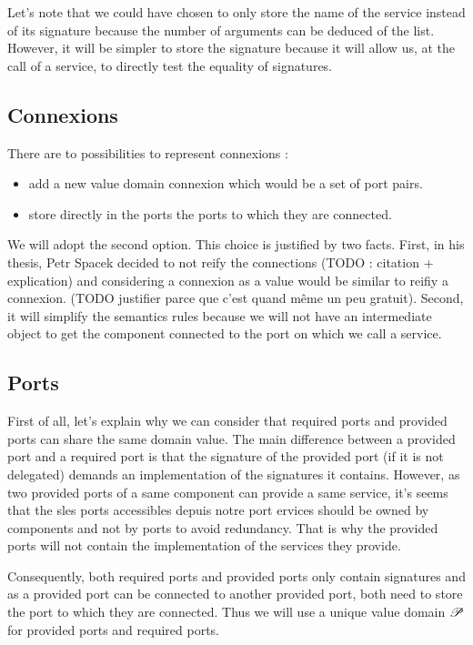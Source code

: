 Let's note that we could have chosen to only store the name of the service instead of its signature because the number of arguments can be deduced of the list. However, it will be simpler to store the signature because it will allow us, at the call of a service, to directly test the equality of signatures.


\subsection{Connexions} There are to possibilities to represent connexions :
\begin{itemize}
\item add a new value domain \textsf{connexion} which would be a set of port pairs. 
\item store directly in the ports the ports to which they are connected.
\end{itemize}

We will adopt the second option. This choice is justified by two facts. First, in his thesis, Petr Spacek decided to not reify the connections (TODO : citation + explication) and considering a connexion as a value would be similar to reifiy a connexion. (TODO justifier parce que c'est quand même un peu gratuit).  Second, it will simplify the semantics rules because we will not have an intermediate object to get the component connected to the port on which we call a service.

\subsection{Ports}
\label{value_ports}
First of all, let's explain why we can consider that required ports and provided ports can share the same domain value. The main difference between a provided port and a required port is that the signature of the provided port (if it is not delegated) demands an implementation of the signatures it contains. However, as two provided ports of a same component can provide a same service, it's seems that the sles ports accessibles depuis notre port ervices should be owned by components and not by ports to avoid redundancy. That is why the provided ports will not contain the implementation of the services they provide. 

Consequently, both required ports and provided ports only contain signatures and as a provided port can be connected to another provided port, both need to store the port to which they are connected. Thus we will use a unique value domain $\mathcal{P}$ for provided ports and required ports.
 

